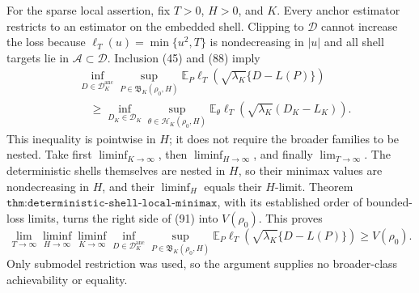 For the sparse local assertion, fix \(T>0\), \(H>0\), and \(K\).  Every
anchor estimator restricts to an estimator on the embedded shell.
Clipping to \(\mathcal D\) cannot increase the loss because
\(\ell_T(u)=\min\{u^2,T\}\) is nondecreasing in \(|u|\) and all shell
targets lie in \(\mathcal A\subset\mathcal D\).  Inclusion (45) and
(88) imply
\[
\begin{aligned}
 &\inf_{D\in\mathscr D_K^{\mathrm{anc}}}
 \sup_{P\in\mathfrak B_K(\rho_0,H)}
 \mathbb E_P\ell_T\!\left(
 \sqrt{\lambda_K}\{D-L(P)\}\right)\\
 &\quad\ge
 \inf_{D_K\in\mathscr D_K}
 \sup_{\theta\in\mathcal H_K(\rho_0,H)}
 \mathbb E_\theta\ell_T\!\left(
 \sqrt{\lambda_K}(D_K-L_K)\right).
\end{aligned}
\tag{91}
\]
This inequality is pointwise in \(H\); it does not require the broader
families to be nested.  Take first \(\liminf_{K\to\infty}\), then
\(\liminf_{H\to\infty}\), and finally
\(\lim_{T\to\infty}\).  The deterministic shells themselves are nested
in \(H\), so their minimax values are nondecreasing in \(H\), and their
\(\liminf_H\) equals their \(H\)-limit.  Theorem
\(\texttt{thm:deterministic-shell-local-minimax}\), with its established
order of bounded-loss limits, turns the right side of (91) into
\(V(\rho_0)\).  This proves
\[
 \lim_{T\to\infty}\liminf_{H\to\infty}\liminf_{K\to\infty}
 \inf_{D\in\mathscr D_K^{\mathrm{anc}}}
 \sup_{P\in\mathfrak B_K(\rho_0,H)}
 \mathbb E_P\ell_T\!\left(
 \sqrt{\lambda_K}\{D-L(P)\}\right)
 \ge V(\rho_0).
\]
Only submodel restriction was used, so the argument supplies no
broader-class achievability or equality.
